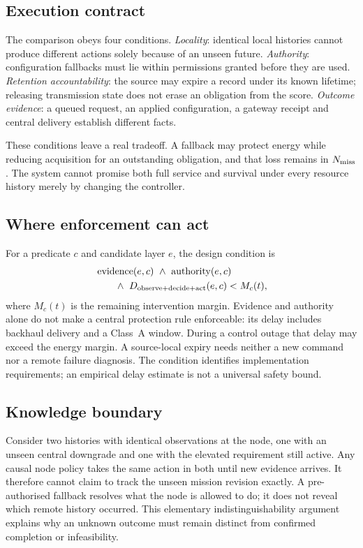 \documentclass[journal,10pt]{IEEEtran}
\begin{document}
\subsection{Execution contract}
The comparison obeys four conditions. \emph{Locality}: identical local histories cannot produce
different actions solely because of an unseen future. \emph{Authority}: configuration fallbacks
must lie within permissions granted before they are used. \emph{Retention accountability}: the
source may expire a record under its known lifetime; releasing transmission state does not erase
an obligation from the score. \emph{Outcome evidence}: a queued request, an applied configuration,
a gateway receipt and central delivery establish different facts.

These conditions leave a real tradeoff. A fallback may protect energy while reducing acquisition
for an outstanding obligation, and that loss remains in $N_{\rm miss}$. The system cannot promise
both full service and survival under every resource history merely by changing the controller.

\subsection{Where enforcement can act}
For a predicate $c$ and candidate layer $e$, the design condition is
\begin{equation}
\begin{split}
&\operatorname{evidence}(e,c)\ \land\ \operatorname{authority}(e,c)\\
&\qquad\land\ D_{\rm observe+decide+act}(e,c)<M_c(t),
\end{split}
\label{eq:placement}
\end{equation}
where $M_c(t)$ is the remaining intervention margin. Evidence and authority alone do not make a
central protection rule enforceable: its delay includes backhaul delivery and a Class~A window.
During a control outage that delay may exceed the energy margin. A source-local expiry needs
neither a new command nor a remote failure diagnosis. The condition identifies implementation
requirements; an empirical delay estimate is not a universal safety bound.

\subsection{Knowledge boundary}
Consider two histories with identical observations at the node, one with an unseen central
downgrade and one with the elevated requirement still active. Any causal node policy takes the
same action in both until new evidence arrives. It therefore cannot claim to track the unseen
mission revision exactly. A pre-authorised fallback resolves what the node is allowed to do;
it does not reveal which remote history occurred. This elementary indistinguishability argument
explains why an unknown outcome must remain distinct from confirmed completion or infeasibility.
\end{document}

